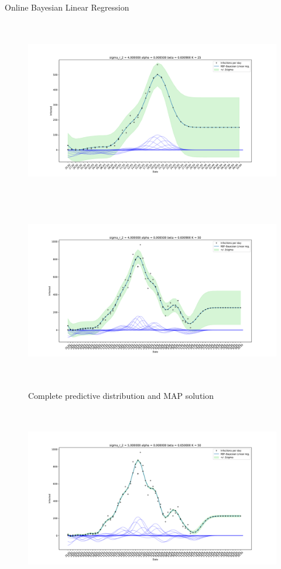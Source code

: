 \documentclass[english]{exercisesheet}
\begin{document}
\begin{nexercise}{Online Bayesian Linear Regression}
\begin{solution}
\begin{figure}
        \includegraphics[width=1\textwidth, height=8cm]{8.pdf}
        \includegraphics[width=1\textwidth, height=8cm]{9.pdf}
        \caption{Complete predictive distribution and MAP solution}
        \end{figure}
        \cleardoublepage
        \begin{figure}
        \includegraphics[width=1\textwidth, height=8cm]{10.pdf}

\end{figure}
\end{solution}
\end{nexercise}
\end{document}
